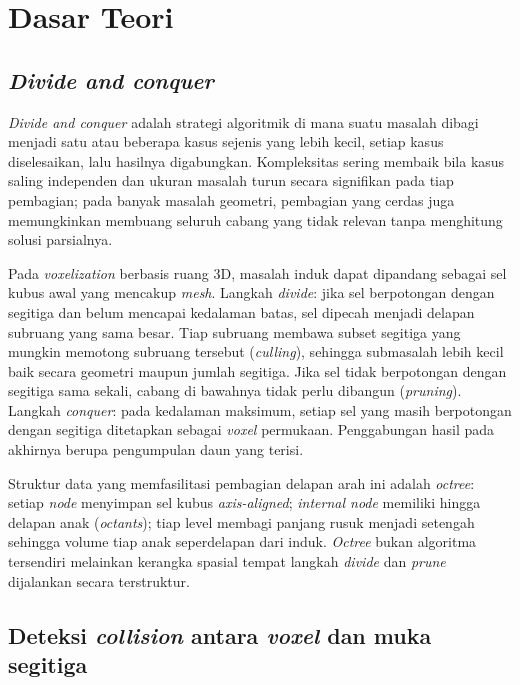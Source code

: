 \documentclass[11pt,a4paper]{article}
\begin{document}
\section{Dasar Teori}

\subsection{\textit{Divide and conquer}}

\textit{Divide and conquer} adalah strategi algoritmik di mana suatu masalah dibagi menjadi satu atau beberapa kasus sejenis yang lebih kecil, setiap kasus diselesaikan, lalu hasilnya digabungkan. Kompleksitas sering membaik bila kasus saling independen dan ukuran masalah turun secara signifikan pada tiap pembagian; pada banyak masalah geometri, pembagian yang cerdas juga memungkinkan membuang seluruh cabang yang tidak relevan tanpa menghitung solusi parsialnya.

Pada \textit{voxelization} berbasis ruang 3D, masalah induk dapat dipandang sebagai sel kubus awal yang mencakup \textit{mesh}. Langkah \textit{divide}: jika sel berpotongan dengan segitiga dan belum mencapai kedalaman batas, sel dipecah menjadi delapan subruang yang sama besar. Tiap subruang membawa subset segitiga yang mungkin memotong subruang tersebut (\textit{culling}), sehingga submasalah lebih kecil baik secara geometri maupun jumlah segitiga. Jika sel tidak berpotongan dengan segitiga sama sekali, cabang di bawahnya tidak perlu dibangun (\textit{pruning}). Langkah \textit{conquer}: pada kedalaman maksimum, setiap sel yang masih berpotongan dengan segitiga ditetapkan sebagai \textit{voxel} permukaan. Penggabungan hasil pada akhirnya berupa pengumpulan daun yang terisi.

Struktur data yang memfasilitasi pembagian delapan arah ini adalah \textit{octree}: setiap \textit{node} menyimpan sel kubus \textit{axis-aligned}; \textit{internal node} memiliki hingga delapan anak (\textit{octants}); tiap level membagi panjang rusuk menjadi setengah sehingga volume tiap anak seperdelapan dari induk. \textit{Octree} bukan algoritma tersendiri melainkan kerangka spasial tempat langkah \textit{divide} dan \textit{prune} dijalankan secara terstruktur.

\subsection{Deteksi \textit{collision} antara \textit{voxel} dan muka segitiga}
\end{document}
